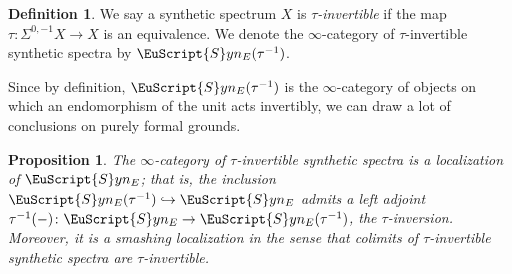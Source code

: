 \documentclass[oneside,a4paper]{amsart}
\newcommand{\euscr}[1]{\EuScript{#1}} %
\newcommand{\synspectra}{\euscr{S}yn} %
\theoremstyle{plain}
\newtheorem{prop}[thm]{Proposition}
\theoremstyle{definition}
\newtheorem{defin}[thm]{Definition}
\theoremstyle{remark}
\begin{document}
\begin{defin}
We say a synthetic spectrum $X$ is \emph{$\tau$-invertible} if the map $\tau \colon \Sigma^{0, -1} X \rightarrow X$ is an equivalence. We denote the $\infty$-category of $\tau$-invertible synthetic spectra by $\synspectra_{E}(\tau^{-1})$. 
\end{defin}
Since by definition, $\synspectra_{E}(\tau^{-1})$ is the $\infty$-category of objects on which an endomorphism of the unit acts invertibly, we can draw a lot of conclusions on purely formal grounds. 

\begin{prop}
\label{prop:tau_inversion_functor_exists}
The $\infty$-category of $\tau$-invertible synthetic spectra is a localization of $\synspectra_{E}$; that is, the inclusion $\synspectra_{E}(\tau^{-1}) \hookrightarrow \synspectra_{E}$ admits a left adjoint $\tau^{-1}(-) \colon \synspectra_{E} \rightarrow \synspectra_{E}(\tau^{-1})$, the $\tau$-inversion. Moreover, it is a smashing localization in the sense that colimits of $\tau$-invertible synthetic spectra are $\tau$-invertible. 
\end{prop}
\end{document}
